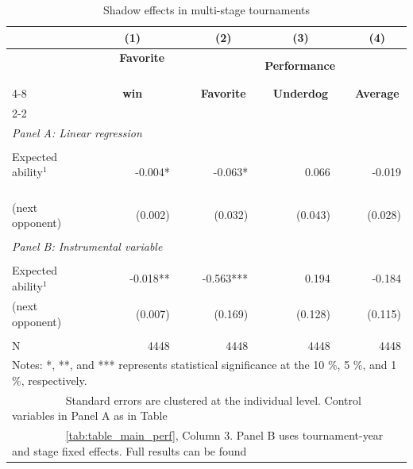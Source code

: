 \documentclass[11pt,a4paper]{article}
\begin{document}
\begin{table}[H]
		\centering
		\caption{Shadow effects in multi-stage tournaments} 
		\label{tab:table_main_fut}
		\begin{tabular}{l r r r r r r r} 
			\toprule
            \toprule
               			& \multicolumn{1}{c}{\textbf{(1)}} &  &  \multicolumn{1}{c}{\textbf{(2)}} & & \multicolumn{1}{c}{\textbf{(3)}} & & \multicolumn{1}{c}{\textbf{(4)}}\\
      \midrule
			& \multicolumn{1}{c}{\textbf{~~~Favorite ~~~}} & ~ &  \multicolumn{5}{c}{\textbf{Performance}}  \\
            \cline{4-8}
   			& \multicolumn{1}{c}{\textbf{win}} &  &  \multicolumn{1}{c}{\textbf{Favorite}} & & \multicolumn{1}{c}{\textbf{Underdog}} & & \multicolumn{1}{c}{\textbf{Average}}\\
            \cline{2-2} \cline{4-4} \cline{6-6} \cline{8-8} \vspace{0.7em}\\   
			\multicolumn{8}{l}{\textit{Panel A: Linear regression}}      \\
            \rule{0pt}{0.01ex}\\
			Expected ability$^1$  ~~~~~~~ & -0.004* & & -0.063*   & & 0.066   & & -0.019  \\
			(next opponent)               & (0.002) & & (0.032)   & & (0.043) & & (0.028) \\
            \rule{0pt}{0.3ex}\\
			\multicolumn{8}{l}{\textit{Panel B: Instrumental variable}}  \\
            \rule{0pt}{0.01ex}\\
			Expected ability$^1$          & -0.018** & & -0.563*** & & 0.194   & & -0.184    \\
			(next opponent)               & (0.007)  & & (0.169)   & & (0.128) & &  (0.115)  \\
            \rule{0pt}{0.3ex}\\ 
            \midrule
            N & 4448 & & 4448 & &4448 & & 4448 \\
			\bottomrule
            \bottomrule
			\multicolumn{8}{l}{\footnotesize Notes: *, **, and *** represents statistical significance at the 10 \%, 5 \%, and 1 \%, respectively. }\\
			\multicolumn{8}{l}{\footnotesize ~~~~~~~~~ Standard errors are clustered at the individual level. Control variables in Panel A  as in Table}\\
			\multicolumn{8}{l}{\footnotesize ~~~~~~~~~  \ref{tab:table_main_perf}, Column 3. Panel B uses tournament-year and stage fixed effects. Full results can be found}\\

\end{tabular}
\end{table}
\end{document}
